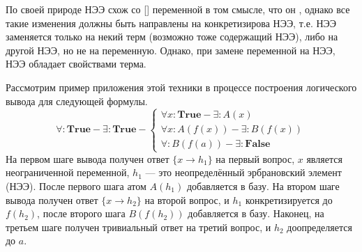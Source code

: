 По своей природе НЭЭ схож со [] переменной в том смысле, что он , однако все такие изменения должны быть направлены  на конкретизирова НЭЭ, т.е. НЭЭ заменяется только на некий терм (возможно тоже содержащий НЭЭ), либо на другой НЭЭ, но не на переменную. Однако, при замене переменной на НЭЭ, НЭЭ обладает  свойствами терма.

Рассмотрим пример приложения этой техники в процессе построения логического вывода для следующей формулы.
\begin{equation}
	\forall\colon\boldsymbol{True} - \exists\colon\boldsymbol{True} -
	\left\lbrace
	\begin{array}{l}
		\forall x\colon\boldsymbol{True} - \exists\colon A(x) \\
		\forall x\colon A(f(x)) - \exists\colon B(f(x)) \\
		\forall\colon B(f(a)) - \exists\colon \boldsymbol{False}
	\end{array}\right.
\end{equation}
На первом шаге вывода получен ответ $\{x \rightarrow h_1\}$ на первый вопрос, $x$ является неограниченной переменной, $h_1$ --- это неопределённый эрбрановский элемент (НЭЭ). После первого шага атом $A(h_1)$ добавляется в базу. На втором шаге вывода получен ответ $\{x \rightarrow h_2\}$ на второй вопрос, и $h_1$ конкретизируется до $f(h_2)$, после второго шага $B(f(h_2))$ добавляется в базу. Наконец, на третьем шаге получен тривиальный ответ на третий вопрос, и $h_2$ доопределяется до $a$.

